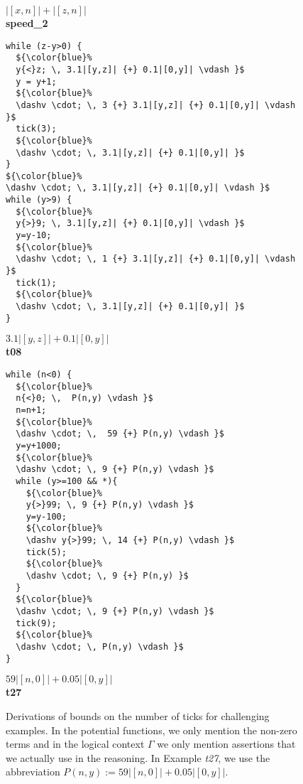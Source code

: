 \documentclass[nocopyrightspace,preprint]{sigplanconf}
\begin{document}
\begin{figure*}[t!]
\begin{minipage}[b]{\progwidth}
\begin{center}
$|[x, n]| + |[z, n]|$
\\[.7\baselineskip]
      {\bf speed\_2}
    \end{center}
  \end{minipage}
%
\hfill
%
  \begin{minipage}[b]{\progwidth}
    \begin{center}
   \begin{lstlisting}
while (z-y>0) {
  ${\color{blue}%
  y{<}z; \, 3.1|[y,z]| {+} 0.1|[0,y]| \vdash }$
  y = y+1;
  ${\color{blue}%
  \dashv \cdot; \, 3 {+} 3.1|[y,z]| {+} 0.1|[0,y]| \vdash }$
  tick(3);
  ${\color{blue}%
  \dashv \cdot; \, 3.1|[y,z]| {+} 0.1|[0,y]| }$
}
${\color{blue}%
\dashv \cdot; \, 3.1|[y,z]| {+} 0.1|[0,y]| \vdash }$
while (y>9) {
  ${\color{blue}%
  y{>}9; \, 3.1|[y,z]| {+} 0.1|[0,y]| \vdash }$
  y=y-10;
  ${\color{blue}%
  \dashv \cdot; \, 1 {+} 3.1|[y,z]| {+} 0.1|[0,y]| \vdash }$
  tick(1);
  ${\color{blue}%
  \dashv \cdot; \, 3.1|[y,z]| {+} 0.1|[0,y]| }$
}
   \end{lstlisting}

$3.1|[y,z]| + 0.1|[0,y]|$
\\[.7\baselineskip] 
      {\bf t08}
    \end{center}
  \end{minipage}
%
\hfill
%
%
%
  \begin{minipage}[b]{\progwidth}
    \begin{center}
   \begin{lstlisting}
while (n<0) {
  ${\color{blue}%
  n{<}0; \,  P(n,y) \vdash }$
  n=n+1;
  ${\color{blue}%
  \dashv \cdot; \,  59 {+} P(n,y) \vdash }$
  y=y+1000;
  ${\color{blue}%
  \dashv \cdot; \, 9 {+} P(n,y) \vdash }$
  while (y>=100 && *){
    ${\color{blue}%
    y{>}99; \, 9 {+} P(n,y) \vdash }$
    y=y-100;
    ${\color{blue}%
    \dashv y{>}99; \, 14 {+} P(n,y) \vdash }$
    tick(5);
    ${\color{blue}%
    \dashv \cdot; \, 9 {+} P(n,y) }$
  }
  ${\color{blue}%
  \dashv \cdot; \, 9 {+} P(n,y) \vdash }$
  tick(9);
  ${\color{blue}%
  \dashv \cdot; \, P(n,y) \vdash }$
}
   \end{lstlisting}
$59|[n,0]| {+} 0.05|[0,y]|$
\\[.7\baselineskip]
      {\bf t27}
    \end{center}
  \end{minipage}

  \caption{Derivations of bounds on the number of ticks for
    challenging examples.  In the potential functions, we only mention
    the non-zero terms and in the logical context $\Gamma$ we only
    mention assertions that we actually use in the reasoning. In
    Example \emph{t27}, we use the abbreviation $P(n,y) := 59|[n,0]|
    {+} 0.05|[0,y]|$.}
  \label{fig:ex_list}
\end{figure*}
\end{document}
